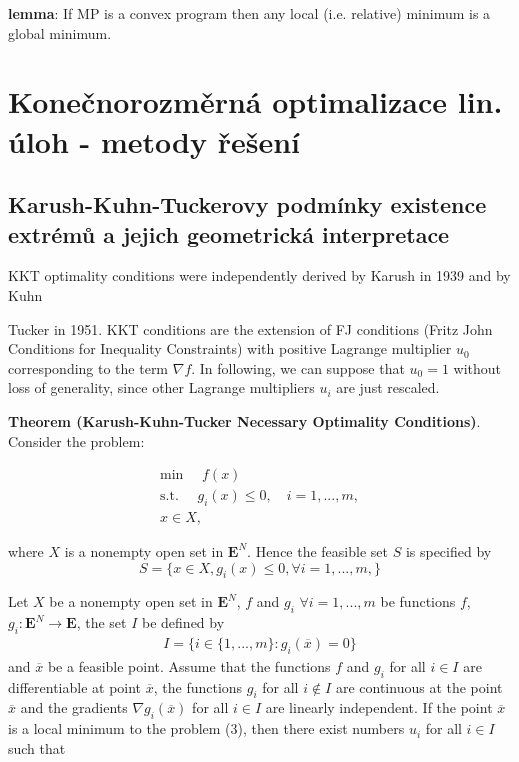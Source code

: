 \textbf{lemma}: If MP is a convex program then any local (i.e. relative)
minimum is a global minimum.

\section{Konečnorozměrná optimalizace lin. úloh - metody řešení}

\subsection{Karush-Kuhn-Tuckerovy podmínky existence extrémů a jejich geometrická interpretace}

KKT optimality conditions were independently derived by Karush in 1939 and by Kuhn{Tucker in 1951.
\newline
KKT conditions are the extension of FJ conditions (Fritz John Conditions for Inequality Constraints) with positive
Lagrange multiplier $u_{0}$ corresponding to the term $\nabla f$. In following, we can suppose that
$u_{0} = 1$ without loss of generality, since other Lagrange multipliers $u_{i}$ are just rescaled.
\bigskip

\textbf{Theorem (Karush-Kuhn-Tucker Necessary Optimality Conditions)}. \newline
Consider the problem: 

\begin{align*}
\mbox{min } \quad  f(x)\\
\mbox{s.t. } \quad g_{i}(x) \leq 0, \quad i = 1, ..., m,\\
x \in X,
\end{align*}

where $X$ is a nonempty open set in $\mathbf{E}^{N}$. Hence the feasible set $S$ is specified by 
$$S = \{x \in X, g_{i}(x) \leq 0, \forall i = 1, ..., m,\} $$

Let $X$ be a nonempty open set in $\mathbf{E}^{N}$, $f$ and $g_{i}$ $\forall i = 1, ..., m$ be
functions $f$, $g_{i}: \mathbf{E}^{N} \rightarrow \mathbf{E}$, the set $I$ be defined by 
\begin{align*}
I = \{i \in \{1,...,m\}:g_i(\overline{x})=0\}
\end{align*}
and $\overline{x}$ be a feasible point. Assume
that the functions $f$ and $g_{i}$ for all $i \in I$ are differentiable at point $\overline{x}$, the functions $g_{i}$ for
all $i \notin I$ are continuous at the point $\overline{x}$ and the gradients $\nabla g_{i}(\overline{x})$ for all $i \in I$ are linearly independent. If the point $\overline{x}$ is a local minimum to the problem (3), then there exist
numbers $u_{i}$ for all $i \in I$ such that

}
